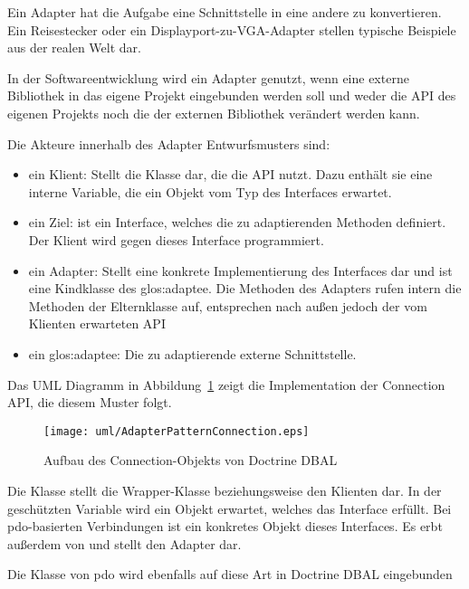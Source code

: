 Ein Adapter hat die Aufgabe eine Schnittstelle in eine andere zu konvertieren. Ein Reisestecker oder ein Displayport-zu-VGA-Adapter stellen typische Beispiele aus der realen Welt dar.

In der Softwareentwicklung wird ein Adapter genutzt, wenn eine externe Bibliothek in das eigene Projekt eingebunden werden soll und weder die API des eigenen Projekts noch die der externen Bibliothek verändert werden kann.

Die Akteure innerhalb des Adapter Entwurfsmusters sind:

\begin{itemize}
	\item ein Klient: Stellt die Klasse dar, die die API nutzt. Dazu enthält sie eine interne Variable, die ein Objekt vom Typ des Interfaces erwartet.
	\item ein Ziel: ist ein Interface, welches die zu adaptierenden Methoden definiert. Der Klient wird gegen dieses Interface programmiert.
	\item ein Adapter: Stellt eine konkrete Implementierung des Interfaces dar und ist eine Kindklasse des \gls{glos:adaptee}. Die Methoden des Adapters rufen intern die Methoden der Elternklasse auf, entsprechen nach außen jedoch der vom Klienten erwarteten API
	\item ein \gls{glos:adaptee}: Die zu adaptierende externe Schnittstelle.
\end{itemize}

\newpage

Das UML Diagramm in Abbildung~\ref{fig:adapterPatternConnection} zeigt die Implementation der Connection API, die diesem Muster folgt.

\begin{figure}[H]
	\centering
	\texttt{[image: uml/AdapterPatternConnection.eps]}
	\caption{Aufbau des Connection-Objekts von Doctrine DBAL}
	\label{fig:adapterPatternConnection}
\end{figure}

Die Klasse  stellt die Wrapper-Klasse beziehungsweise den Klienten dar. In der geschützten Variable  wird ein Objekt erwartet, welches das Interface  erfüllt. Bei \gls{pdo}-basierten Verbindungen ist  ein konkretes Objekt dieses Interfaces. Es erbt außerdem von  und stellt den Adapter dar.

Die Klasse  von \gls{pdo} wird ebenfalls auf diese Art in Doctrine DBAL eingebunden

